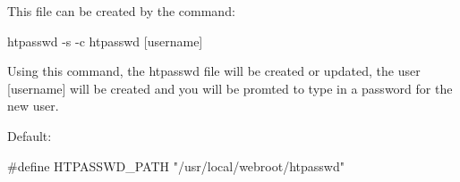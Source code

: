 \begin{DoxyItemize}
This file can be created by the command\+: \begin{DoxyVerb}htpasswd -s -c htpasswd [username]
\end{DoxyVerb}


Using this command, the htpasswd file will be created or updated, the user \mbox{[}username\mbox{]} will be created and you will be promted to type in a password for the new user.

Default\+: \begin{DoxyVerb}#define HTPASSWD_PATH "/usr/local/webroot/htpasswd" \end{DoxyVerb}
 
\end{DoxyItemize}